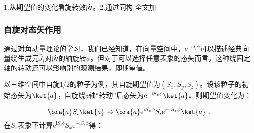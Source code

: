 
\begin{issues}
\issueDraft
1.从期望值的变化看旋转效应。2.通过同构
全文加\hat
\end{issues}

\subsubsection{自旋对态矢作用}
 通过对角动量理论的学习，我们已经知道，在向量空间中，$\mathrm e^{-\mathrm i\hat J_i\phi}$可以描述经典向量绕生成元$\hat J_i$对应的轴旋转$\phi$。但对于可以选择任意表象的态矢而言，这种绕固定轴的转动还可以影响别的观测结果，即期望值。

以三维空间中自旋$1/2$的粒子为例，其自旋期望值为$(\overline{S_x},\overline{S_y},\overline{S_z})$。设该粒子的初始态矢为$\ket{a}$，自旋绕$z$轴“转动”后态矢为$\mathrm e^{-\mathrm i S_z\phi}\ket{a}$。则期望值变化为：

\begin{equation}
\bra{a}S_i\ket{a}\rightarrow \bra{a}\mathrm e^{\mathrm i S_z\phi}S_i\mathrm e^{-\mathrm i S_z\phi}\ket{a}~.
\end{equation}
在$S_z$表象下计算$\mathrm e^{\mathrm i S_z\phi}S_x\mathrm e^{-\mathrm i S_z\phi}$得：

